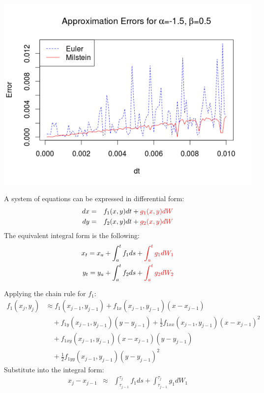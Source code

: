 \begin{frame}
	\begin{center}
	\includegraphics[scale=0.55]{alpham15_beta05.png} 
	\end{center}
\end{frame}

\begin{frame}
A system of equations can be expressed in differential form:
	\begin{eqnarray*}
		dx&=&f_1(x,y)dt+{\color{red}g_1(x,y)dW}\\
		dy&=&f_2(x,y)dt+{\color{red}g_2(x,y)dW}\\
	\end{eqnarray*}
The equivalent integral form is the following:
	\begin{eqnarray*}
		x_t=x_a+\int_{a}^{t}f_1 ds+{\color{red}\int_{a}^{t}g_1dW_1}\\
		y_t=y_a+\int_{a}^{t}f_2 ds+{\color{red}\int_{a}^{t}g_2dW_2}\\
	\end{eqnarray*}	
\end{frame}


\begin{frame}
Applying the chain rule for $f_1$:
	\begin{equation*}
	\begin{split}
	f_1(x_j,y_j) & \approx f_1(x_{j-1},y_{j-1})+f_{1x}(x_{j-1},y_{j-1})(x-x_{j-1})\\
	& \quad +f_{1y}(x_{j-1},y_{j-1})(y-y_{j-1})+\frac{1}{2} f_{1xx}(x_{j-1},y_{j-1})(x-
	x_{j-1})^2\\
	& \quad +f_{1xy}(x_{j-1},y_{j-1})(x-x_{j-1})(y-y_{j-1})\\
	& \quad +\frac{1}{2}f_{1yy}(x_{j-1},y_{j-1})(y-y_{j-1})^2
	\end{split}
	\end{equation*}
Substitute into the integral form:
	\begin{eqnarray*}
	x_j-x_{j-1} & \approx & \int_{\tau_{j-1}}^{\tau_{j}}f_1 ds+\int_{\tau_{j-1}}^{\tau_{j}}g_1dW_1
	\end{eqnarray*}
\end{frame}


